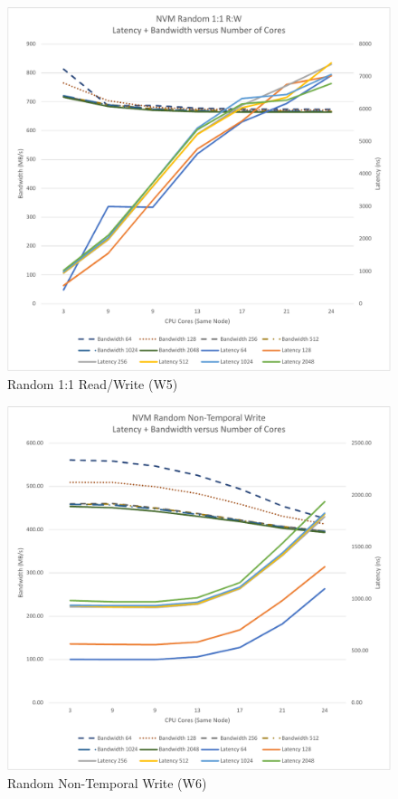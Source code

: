\begin{figure}
    \centering
    \caption{Random 1:1 Read/Write (W5)}\label{chart:random:W5}
    \includegraphics[scale=0.5]{charts/random-w5-crop.pdf}
\end{figure}





\begin{figure}
    \centering
    \caption{Random Non-Temporal Write (W6)}\label{chart:random:w6}
    \includegraphics[scale=0.5]{charts/random-w6-crop.pdf}
\end{figure}

